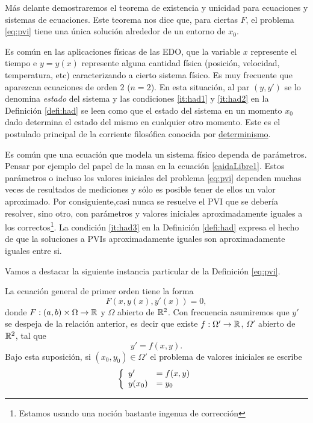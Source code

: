 Más delante demostraremos el teorema de existencia y unicidad para ecuaciones y sistemas de ecuaciones. Este teorema nos dice que, para ciertas $F$, el problema \eqref{eq:pvi} tiene una única solución alrededor de un entorno de $x_0$.

Es común en las aplicaciones físicas de las EDO, que la variable $x$ represente el tiempo e $y=y(x)$ represente alguna cantidad física (posición, velocidad, temperatura, etc) caracterizando a cierto sistema físico. Es muy frecuente que aparezcan ecuaciones de orden $2$  ($n=2$). En esta situación, al par $(y,y')$ se lo denomina \emph{estado} del sistema y las condiciones \ref{it:had1} y \ref{it:had2} en la Definición \ref{defi:had} se leen como que el estado del sistema en un momento $x_0$ dado determina el estado del mismo en cualquier otro momento. Este es el postulado principal de la corriente  filosófica conocida por   \href{https://es.wikipedia.org/wiki/Determinismo}{determinismo}\link .

 Es común que una ecuación que modela un sistema físico dependa de parámetros. Pensar por ejemplo del papel de la masa en la ecuación \eqref{caidaLibre1}. Estos parámetros o incluso los valores iniciales del problema \eqref{eq:pvi} dependen muchas veces de resultados de mediciones y sólo es posible tener de ellos un valor aproximado. Por consiguiente,casi nunca se resuelve el PVI que se debería resolver, sino otro, con parámetros y valores iniciales aproximadamente iguales a los correctos\footnote{Estamos usando una noción bastante ingenua de corrección}.
 La condición \ref{it:had3} en la Definición \ref{defi:had} expresa el hecho de que la soluciones a PVIs aproximadamente iguales son aproximadamente iguales entre si.


 Vamos a destacar la siguiente instancia particular de la Definición \ref{eq:pvi}.


\begin{definicion} La ecuación general de primer orden tiene la forma
\[
F(x,y(x),y'(x))=0,
\]
donde $F:(a,b)\times \Omega\to\rr$ y $\Omega$ abierto de $\rr^2$. Con frecuencia asumiremos que $y'$ se despeja de la relación anterior, es decir que existe $f:\Omega'\to\rr$,
$\Omega'$ abierto de $\rr^2$, tal que
\[y'=f(x,y).\]
Bajo esta suposición, si $(x_0,y_0)\in\Omega'$ el problema de valores iniciales se escribe
\[\left\{\begin{array}{l l}
	    y'&=f(x,y)\\
	    y(x_0)&=y_0
         \end{array}\right.
\]
\end{definicion}



